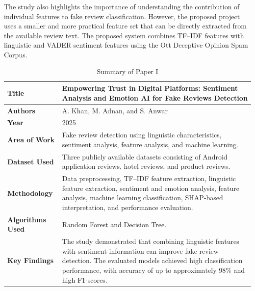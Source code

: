 \documentclass[12pt,a4paper]{report}
\begin{document}
The study also highlights the importance of understanding the contribution of individual features to fake review classification. However, the proposed project uses a smaller and more practical feature set that can be directly extracted from the available review text. The proposed system combines TF--IDF features with linguistic and VADER sentiment features using the Ott Deceptive Opinion Spam Corpus.

\begin{table}[H]
\centering
\small
\renewcommand{\arraystretch}{1.3}

\begin{tabularx}{0.95\textwidth}{|p{}|X|}
\hline
\textbf{Title} &
Empowering Trust in Digital Platforms: Sentiment Analysis and Emotion AI for Fake Reviews Detection \\
\hline

\textbf{Authors} &
A. Khan, M. Adnan, and S. Anwar \\
\hline

\textbf{Year} &
2025 \\
\hline

\textbf{Area of Work} &
Fake review detection using linguistic characteristics, sentiment analysis, feature analysis, and machine learning. \\
\hline

\textbf{Dataset Used} &
Three publicly available datasets consisting of Android application reviews, hotel reviews, and product reviews. \\
\hline

\textbf{Methodology} &
Data preprocessing, TF--IDF feature extraction, linguistic feature extraction, sentiment and emotion analysis, feature analysis, machine learning classification, SHAP-based interpretation, and performance evaluation. \\
\hline

\textbf{Algorithms Used} &
Random Forest and Decision Tree. \\
\hline

\textbf{Key Findings} &
The study demonstrated that combining linguistic features with sentiment information can improve fake review detection. The evaluated models achieved high classification performance, with accuracy of up to approximately 98\% and high F1-scores. \\
\hline

\end{tabularx}

\caption{Summary of Paper I}
\label{tab:paper1}
\end{table}
\end{document}
